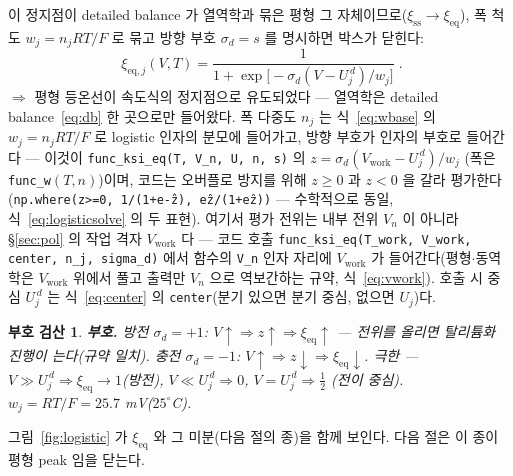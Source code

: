 \documentclass[11pt,a4paper]{article}
\newtheorem*{signbox}{부호 검산}
\newcommand{\eq}{\mathrm{eq}}
\newcommand{\work}{\mathrm{work}}
\newcommand{\sstat}{\mathrm{ss}}
\newcommand{\code}[1]{\texttt{#1}}
\begin{document}
이 정지점이 detailed balance 가 열역학과 묶은 평형 그 자체이므로($\xi_\sstat\to\xi_\eq$), 폭 척도
$w_j=n_jRT/F$ 로 묶고 방향 부호 $\sigma_d=s$ 를 명시하면 박스가 닫힌다:
\begin{equation}
\boxed{\;\xi_{\eq,j}(V,T)=\frac{1}{1+\exp\!\big[-\sigma_d(V-U_j^{\,d})/w_j\big]}\;.}
\label{eq:xieq}
\end{equation}
$\Rightarrow$ 평형 등온선이 속도식의 정지점으로 유도되었다 — 열역학은 detailed balance~\eqref{eq:db} 한 곳으로만
들어왔다. 폭 다중도 $n_j$ 는 식~\eqref{eq:wbase} 의 $w_j=n_jRT/F$ 로 logistic 인자의 분모에 들어가고, 방향 부호가
인자의 부호로 들어간다 — 이것이 \code{func\_ksi\_eq(T, V\_n, U, n, s)} 의 $z=\sigma_d(V_\work-U_j^{\,d})/w_j$
(폭은 \code{func\_w}$(T,n)$)이며, 코드는 오버플로 방지를 위해 $z\ge0$ 과 $z<0$ 을 갈라 평가한다
(\code{np.where(z>=0, 1/(1+e\^{-z}), e\^{z}/(1+e\^{z}))} — 수학적으로 동일, 식~\eqref{eq:logisticsolve} 의 두 표현).
여기서 평가 전위는 내부 전위 $V_n$ 이 아니라 \S\ref{sec:pol} 의 작업 격자 $V_\work$ 다 — 코드 호출
\code{func\_ksi\_eq(T\_work, V\_work, center, n\_j, sigma\_d)} 에서 함수의 \code{V\_n} 인자 자리에 $V_\work$ 가
들어간다(평형$\cdot$동역학은 $V_\work$ 위에서 풀고 출력만 $V_n$ 으로 역보간하는 규약, 식~\eqref{eq:vwork}). 호출 시
중심 $U_j^{\,d}$ 는 식~\eqref{eq:center} 의 \code{center}(분기 있으면 분기 중심, 없으면 $U_j$)다.

\begin{signbox}
\textbf{부호.} 방전 $\sigma_d=+1$: $V\!\uparrow\Rightarrow z\!\uparrow\Rightarrow\xi_\eq\!\uparrow$ — 전위를 올리면
탈리튬화 진행이 는다(규약 일치). 충전 $\sigma_d=-1$: $V\!\uparrow\Rightarrow z\!\downarrow\Rightarrow\xi_\eq\!\downarrow$.
극한 — $V\gg U_j^{\,d}\Rightarrow\xi_\eq\to1$(방전), $V\ll U_j^{\,d}\Rightarrow0$, $V=U_j^{\,d}\Rightarrow\tfrac12$
(전이 중심). $w_j=RT/F=25.7$ mV($25^\circ$C).
\end{signbox}

그림~\ref{fig:logistic} 가 $\xi_\eq$ 와 그 미분(다음 절의 종)을 함께 보인다. 다음 절은 이 종이 평형 peak 임을 닫는다.
\end{document}
